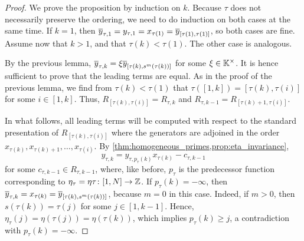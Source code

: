\begin{proof}
	We prove the proposition by induction on $k$. Because $\tau$ does not necessarily preserve the ordering, we need to do induction on both cases at the same time. If $k=1$, then $\overline{y}_{\tau, 1} = y_{\tau, 1} = x_{\tau(1)} = \overline{y}_{[\tau(1), \tau(1)]}$, so both cases are fine. Assume now that $k > 1$, and that $\tau(k) < \tau(1)$. The other case is analogous.

	By the previous lemma, $\overline{y}_{\tau, k} = \xi \overline{y}_{[\tau(k), s^m(\tau(k))]}$ for some
	$\xi \in \mathbb{K}^\times$. It is hence sufficient to prove that the leading terms are
	equal. As in the proof of the previous lemma, we find from $\tau(k) < \tau(1)$ that
	$\tau([1, k]) = [\tau(k), \tau(i)]$ for some $i \in [1, k]$. Thus, $R_{[\tau(k),
						\tau(i)]} = R_{\tau, k}$ and $R_{\tau, k-1} = R_{[\tau(k) + 1, \tau(i)]}$.

	In what follows, all leading terms will be computed with respect to the standard
	presentation of $R_{[\tau(k), \tau(i)]}$ where the generators are adjoined in the order
	$x_{\tau(k)}, x_{\tau(k) + 1}, \dots, x_{\tau(i)}$. By
	\cref{thm:homogeneous_primes,prop:eta_invariance},
	\begin{equation*}
		y_{\tau, k} = y_{\tau, p_{\tau}(k)}x_{\tau(k)} - c_{\tau, k-1}
	\end{equation*}
	for some $c_{\tau, k-1} \in R_{\tau, k-1}$, where, like before, $p_\tau$ is the
	predecessor function corresponding to $\eta_\tau = \eta \tau \colon [1, N] \to \mathbb{Z}$.
	If $p_\tau(k) = -\infty$, then $\overline{y}_{\tau, k} = x_{\tau(k)} = \overline{y}_{[\tau(k),
					s^m(\tau(k))]}$, because $m = 0$ in this case. Indeed, if $m>0$, then $s(\tau(k)) =
		\tau(j)$ for some $j \in [1, k-1]$. Hence, $\eta_\tau(j) = \eta(\tau(j)) =
		\eta(\tau(k))$, which implies $p_\tau(k) \geq j$, a contradiction with $p_\tau(k) =
		-\infty$.


\end{proof}
